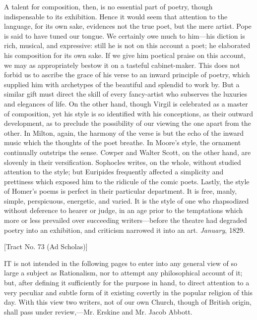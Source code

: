 A talent for composition, then, is no essential part of poetry,
though indispensable to its exhibition. Hence it would seem that
attention to the language, for its own sake, evidences not the true
poet, but the mere artist. Pope is said to have tuned our tongue. We
certainly owe much to him—his diction is rich, musical, and
expressive: still he is not on this account a poet; he elaborated his
composition for its own sake. If we give him poetical praise on
this account, we may as appropriately bestow it on a tasteful
cabinet-maker. This does not forbid us to ascribe the grace of his
verse to an inward principle of poetry, which supplied him with
archetypes of the beautiful and splendid to work by. But a similar
gift must direct the skill of every fancy-artist who subserves the
luxuries and elegances of life. On the other hand, though Virgil is
celebrated as a master of composition, yet his style is so identified
with his conceptions, as their outward development, as to preclude the
possibility of our viewing the one apart from the other. In Milton,
again, the harmony of the verse is but the echo of the inward music
which the thoughts of the poet breathe. In Moore's style, the ornament
continually outstrips the sense. Cowper and Walter Scott, on the other
hand, are slovenly in their versification. Sophocles writes, on the
whole, without studied attention to the style; but Euripides
frequently affected a simplicity and prettiness which exposed him to
the ridicule of the comic poets. Lastly, the style of Homer's poems is
perfect in their particular department. It is free, manly, simple,
perspicuous, energetic, and varied. It is the style of one who
rhapsodized without deference to hearer or judge, in an age prior to
the temptations which more or less prevailed over succeeding writers—before
the theatre had degraded poetry into an exhibition, and criticism
narrowed it into an art.
\emph{January}, 1829.


[Tract No. 73 (Ad Scholas)]

IT is
not intended in the following pages to enter into any general view of
so large a subject as Rationalism, nor to attempt any philosophical
account of it; but, after defining it sufficiently for the purpose in
hand, to direct attention to a very peculiar and subtle form of it
existing covertly in the popular religion of this day. With this view
two writers, not of our own Church, though of British origin, shall
pass under review,—Mr. Erskine and Mr. Jacob Abbott.

